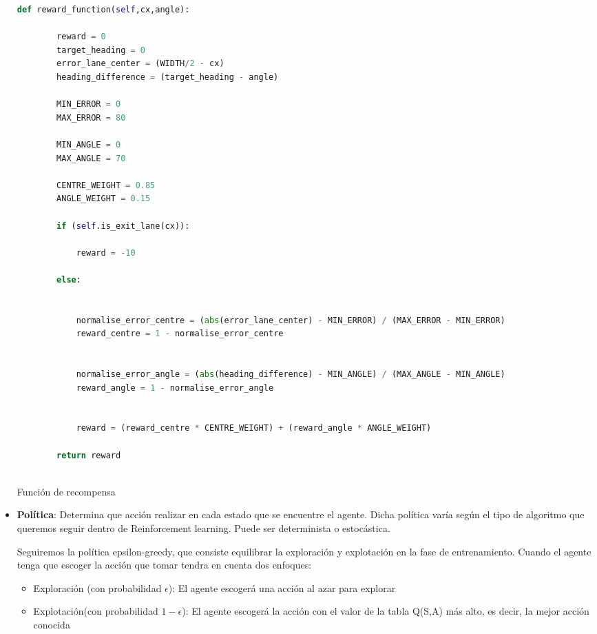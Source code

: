 \begin{itemize}
\begin{code}[H]
\begin{lstlisting}[language=Python]
        def reward_function(self,cx,angle):

        reward = 0
        target_heading = 0
        error_lane_center = (WIDTH/2 - cx)
        heading_difference = (target_heading - angle) 
        
        MIN_ERROR = 0
        MAX_ERROR = 80

        MIN_ANGLE = 0
        MAX_ANGLE = 70

        CENTRE_WEIGHT = 0.85
        ANGLE_WEIGHT = 0.15
        
        if (self.is_exit_lane(cx)):
            
            reward = -10

        else:

            
            normalise_error_centre = (abs(error_lane_center) - MIN_ERROR) / (MAX_ERROR - MIN_ERROR)
            reward_centre = 1 - normalise_error_centre

            
            normalise_error_angle = (abs(heading_difference) - MIN_ANGLE) / (MAX_ANGLE - MIN_ANGLE)
            reward_angle = 1 - normalise_error_angle


            reward = (reward_centre * CENTRE_WEIGHT) + (reward_angle * ANGLE_WEIGHT)
            
        return reward
       
      \end{lstlisting}
      \caption[Función de recompensa]{Función de recompensa}
      \label{cod:codejemplo}
      \end{code}
    \item \textbf{Política}: Determina que acción realizar en cada estado que se encuentre el agente. Dicha política varía según el tipo de algoritmo que queremos seguir dentro de Reinforcement learning.
    Puede ser determinista o estocástica. \newline

    Seguiremos la política epsilon-greedy\cite{Epsilon-greedy}, que consiste 
 equilibrar la exploración y explotación en la fase de entrenamiento. Cuando el agente tenga que escoger la acción que tomar tendra en cuenta dos enfoques:
 
 \begin{itemize}
   \item Exploración (con probabilidad $\epsilon$): El agente escogerá una acción al azar para explorar
   \item Explotación(con probabilidad $ 1 - \epsilon$): El agente escogerá la acción con el valor de la tabla Q(S,A) más alto, es decir, la mejor acción conocida
 \end{itemize}
 

\end{itemize}
